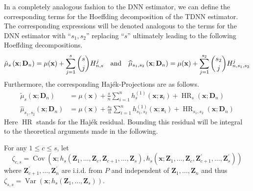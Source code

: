 \documentclass[letterpaper,10pt]{article}
\numberwithin{equation}{section}
\numberwithin{thm}{section}
\renewcommand{\hat}{\widehat}
\newcommand{\1}{\mathbb{1}}
\begin{document}
In a completely analogous fashion to the DNN estimator, we can define the corresponding terms for the Hoeffding decomposition of the TDNN estimator.
The corresponding expressions will be denoted analogous to the terms for the DNN estimator with ``$s_1, s_2$'' replacing ``$s$'' ultimately leading to the following Hoeffding decompositions.
\begin{equation}
	\tilde{\mu}_{s}\left(\mathbf{x}; \mathbf{D}_n\right)
	= \mu(\mathbf{x}) + \sum_{j = 1}^{s}\binom{s}{j}H_{n,s}^{j}\\
	\quad \text{and} \quad
	\hat{\mu}_{s_1, s_2}\left(\mathbf{x}; \mathbf{D}_n\right)
	= \mu(\mathbf{x}) + \sum_{j = 1}^{s_2}\binom{s_2}{j}H_{n,s_1, s_2}^{j}
\end{equation}
Furthermore, the corresponding Haj\'ek-Projections are as follows.
\begin{equation}
	\begin{aligned}
		\tilde{\mu}_{s}\left(\mathbf{x}; \mathbf{D}_n\right)
		 & = \mu(\mathbf{x}) + \frac{s}{n}\sum_{i = 1}^{n}h^{(1)}_{s}(\mathbf{x}; \mathbf{z}_{i})
		+ \operatorname{HR}_{s}(\mathbf{x}; \mathbf{D}_n)                                                   \\
		\hat{\mu}_{s_1, s_2}\left(\mathbf{x}; \mathbf{D}_n\right)
		 & = \mu(\mathbf{x}) + \frac{s_2}{n}\sum_{i = 1}^{n} h^{(1)}_{s_1, s_2}(\mathbf{x}; \mathbf{z}_{i})
		+ \operatorname{HR}_{s_1, s_2}(\mathbf{x}; \mathbf{D}_n)
	\end{aligned}
\end{equation}
Here $\operatorname{HR}$ stands for the Haj\'ek residual.
Bounding this residual will be integral to the theoretical arguments made in the following.

For any $1 \leq c \leq s$, let
\begin{equation}
	\zeta_{c,s}
	= \operatorname{Cov}\left(\mathbf{x}; h_s\left(\mathbf{Z}_1, \ldots, \mathbf{Z}_c, \mathbf{Z}_{c+1}, \ldots, \mathbf{Z}_s\right),
	h_s\left(\mathbf{x}; \mathbf{Z}_1, \ldots, \mathbf{Z}_c, \mathbf{Z}_{c+1}^{\prime}, \ldots, \mathbf{Z}_s^{\prime}\right)\right)
\end{equation}
where $\mathbf{Z}_{c+1}^{\prime}, \ldots, \mathbf{Z}_n^{\prime}$ are i.i.d. from $P$ and independent of $\mathbf{Z}_1, \ldots, \mathbf{Z}_n$ and thus
$\zeta_{s,s} = \operatorname{Var}\left(\mathbf{x}; h_s\left(\mathbf{Z}_1, \ldots, \mathbf{Z}_s\right)\right).$


\newpage
\end{document}
